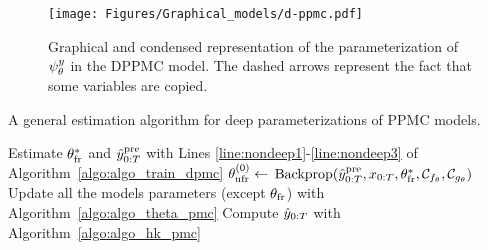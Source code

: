 %
%



\begin{figure}[htb]
  \centering
  \texttt{[image: Figures/Graphical\_models/d-ppmc.pdf]}
  \caption{Graphical and condensed representation of the parameterization of
  $\psi^{y}_{\theta}$ in the DPPMC model. 
  The dashed arrows represent the fact that some variables are copied. 
  }
  \label{fig:pretrain_dppmc}
\end{figure}


\begin{algorithm}[htbp!]
  \caption{A general estimation algorithm for deep parameterizations of PPMC models.}
  \label{algo:algo_train_dppmc}
  \begin{algorithmic}[1]
    \State Estimate $\theta_{\mathrm{fr}}^*$ and $\hat{y}_{0:T}^{\mathrm{pre}}$ with Lines \eqref{line:nondeep1}-\eqref{line:nondeep3} of Algorithm~\ref{algo:algo_train_dpmc}
    \State   $\theta_{\mathrm{ufr}}^{(0)} \leftarrow$ ${\rm Backprop}(\hat{y}_{0:T}^{\mathrm{pre}},x_{0:T},\theta_{\mathrm{fr}}^*, \mathcal{C}_{f_{\theta}}, \mathcal{C}_{g_{\theta}})$
    \State Update all the models parameters (except $\theta_{\mathrm{fr}}$) with Algorithm~\ref{algo:algo_theta_pmc}
    \State Compute $\hat{y}_{0:T}$ with Algorithm~\ref{algo:algo_hk_pmc} 
  \end{algorithmic}
\end{algorithm}



